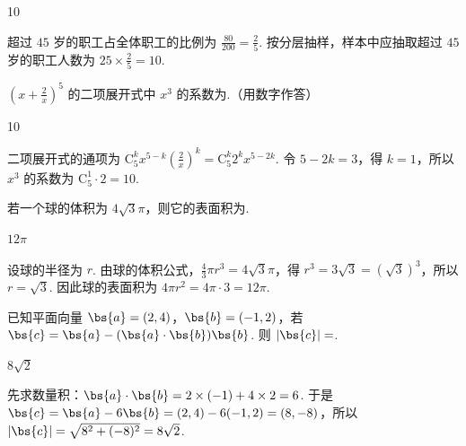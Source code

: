 \begin{answer}
10
\end{answer}

\begin{solution}
超过 \(45\) 岁的职工占全体职工的比例为 \(\frac{80}{200}=\frac{2}{5}\). 按分层抽样，样本中应抽取超过 \(45\) 岁的职工人数为 \(25\times\frac{2}{5}=10\).
\end{solution}

\begin{problem}
\(\left(x + \frac{2}{x}\right)^5\) 的二项展开式中 \(x^3\) 的系数为\fillinblank{}.（用数字作答）
\end{problem}

\begin{answer}
10
\end{answer}

\begin{solution}
二项展开式的通项为 \(\mathrm C_5^k x^{5-k}\left(\frac{2}{x}\right)^k=\mathrm C_5^k2^k x^{5-2k}\). 令 \(5-2k=3\)，得 \(k=1\)，所以 \(x^3\) 的系数为 \(\mathrm C_5^1\cdot2=10\).
\end{solution}

\begin{problem}
若一个球的体积为 \(4\sqrt{3}\pi\)，则它的表面积为\fillinblank{}.
\end{problem}

\begin{answer}
\(12\pi\)
\end{answer}

\begin{solution}
设球的半径为 \(r\). 由球的体积公式，\(\frac{4}{3}\pi r^3=4\sqrt{3}\pi\)，得 \(r^3=3\sqrt{3}=(\sqrt{3})^3\)，所以 \(r=\sqrt{3}\). 因此球的表面积为 \(4\pi r^2=4\pi\cdot3=12\pi\).
\end{solution}

\begin{problem}
已知平面向量 \(\bs{a} = (2, 4)\)，\(\bs{b} = (-1, 2)\)，若 \(\bs{c} = \bs{a} - (\bs{a} \cdot \bs{b})\bs{b}\). 则 \(|\bs{c}| = \)\fillinblank{}.
\end{problem}

\begin{answer}
\(8\sqrt{2}\)
\end{answer}

\begin{solution}
先求数量积：\(\bs{a}\cdot\bs{b}=2\times(-1)+4\times2=6\). 于是
\(\bs{c}=\bs{a}-6\bs{b}=(2,4)-6(-1,2)=(8,-8)\)，所以 \(|\bs{c}|=\sqrt{8^2+(-8)^2}=8\sqrt{2}\).
\end{solution}


